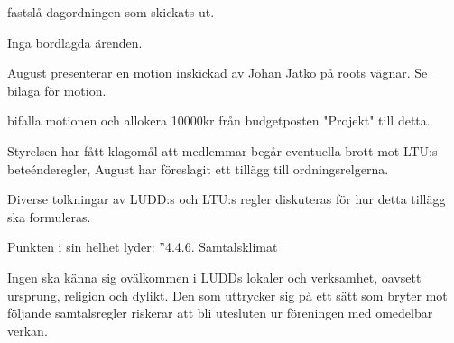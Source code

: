 \documentclass{protokoll}
\date{2019-02-17}  %
\begin{document}
\newpage  


\begin{beslut}
     \att fastslå dagordningen som skickats ut.
\end{beslut}

Inga bordlagda ärenden.

August presenterar en motion inskickad av Johan Jatko på roots vägnar. Se
bilaga för motion. 
\begin{beslut}
    \att bifalla motionen och allokera 10000kr från budgetposten "Projekt" till
    detta.
\end{beslut}

Styrelsen har fått klagomål att medlemmar begår eventuella brott mot LTU:s 
beteénderegler, August har föreslagit ett tillägg till ordningsrelgerna.  

Diverse tolkningar av LUDD:s och LTU:s regler diskuteras för hur detta tillägg
ska formuleras. 

Punkten i sin helhet lyder: 
''4.4.6. Samtalsklimat


Ingen ska känna sig ovälkommen i LUDDs lokaler och verksamhet, oavsett ursprung, religion och dylikt. Den som uttrycker sig på ett sätt som bryter mot följande samtalsregler riskerar att bli utesluten ur föreningen med omedelbar verkan.
\end{document}
